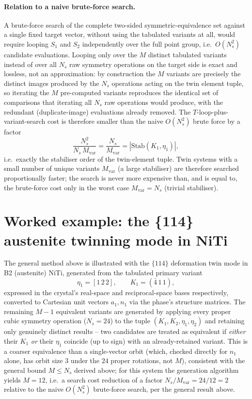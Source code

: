 \documentclass[11pt]{article}
\newcommand{\Kone}{K_1}
\newcommand{\Ktwo}{K_2}
\newcommand{\etaone}{\eta_1}
\newcommand{\etatwo}{\eta_2}
\begin{document}
\paragraph{Relation to a naive brute-force search.} A brute-force search
of the complete two-sided symmetric-equivalence set against a single
fixed target vector, without using the tabulated variants at all, would
require looping $S_1$ and $S_2$ independently over the full point group,
i.e.\ $O(N_s^2)$ candidate evaluations. Looping only over the $M$
distinct tabulated variants instead of over all $N_s$ raw symmetry
operations on the target side is exact and lossless, not an
approximation: by construction the $M$ variants are precisely the
distinct images produced by the $N_s$ operations acting on the twin
element tuple, so iterating the $M$ pre-computed variants reproduces the
identical set of comparisons that iterating all $N_s$ raw operations
would produce, with the redundant (duplicate-image) evaluations already
removed. The $T$-loop-plus-variant-search cost is therefore smaller than
the naive $O(N_s^2)$ brute force by a factor
\begin{equation}
  \frac{N_s^2}{N_s \, M_{\text{var}}} = \frac{N_s}{M_{\text{var}}}
  = |\mathrm{Stab}(\Kone,\etaone)|,
\end{equation}
i.e.\ exactly the stabiliser order of the twin-element tuple. Twin
systems with a small number of unique variants $M_{\text{var}}$ (a large
stabiliser) are therefore searched proportionally faster; the search is
never more expensive than, and is equal to, the brute-force cost only in
the worst case $M_{\text{var}} = N_s$ (trivial stabiliser).

\section{Worked example: the \{114\} austenite twinning mode in NiTi}
\label{sec:example}

The general method above is illustrated with the $\{114\}$ deformation
twin mode in B2 (austenite) NiTi, generated from the tabulated primary
variant
\begin{equation}
  \etaone = [1\,2\,2],\qquad \Kone = (\bar 4\,1\,1),
\end{equation}
expressed in the crystal's real-space and reciprocal-space bases
respectively, converted to Cartesian unit vectors $a_1, n_1$ via the
phase's structure matrices. The remaining $M-1$ equivalent variants are
generated by applying every proper cubic symmetry operation
($N_s = 24$) to the tuple $(\Kone,\Ktwo,\etaone,\etatwo)$ and retaining
only genuinely distinct results -- two candidates are treated as
equivalent if \emph{either} their $\Kone$ \emph{or} their $\etaone$
coincide (up to sign) with an already-retained variant. This is a
coarser equivalence than a single-vector orbit (which, checked directly
for $n_1$ alone, has orbit size $3$ under the $24$ proper rotations, not
$M$), consistent with the general bound $M \le N_s$ derived above; for
this system the generation algorithm yields $M = 12$, i.e.\ a search
cost reduction of a factor $N_s/M_{\text{var}} = 24/12 = 2$ relative to
the naive $O(N_s^2)$ brute-force search, per the general result above.
\end{document}
